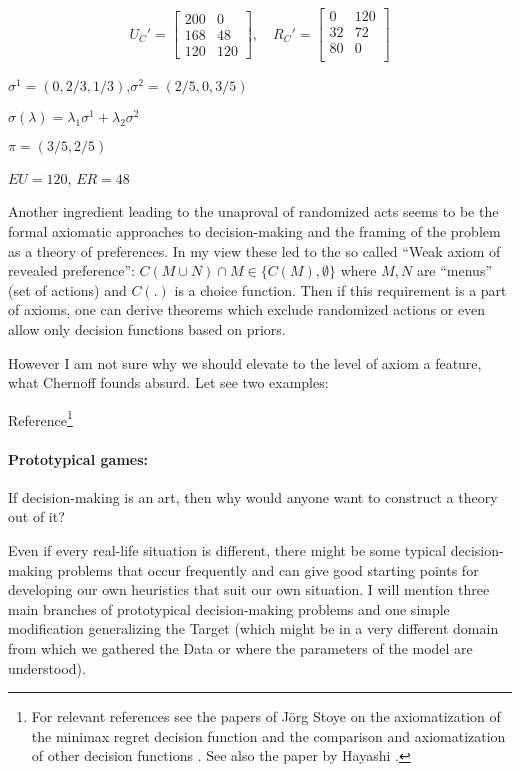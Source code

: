 \documentclass{article}
\begin{document}
\[
U_C' =
\begin{bmatrix}
    200 & 0 \\
    168 & 48 \\
    120 & 120
\end{bmatrix}
, \quad
R_C' =
\begin{bmatrix}
    0 & 120 \\
    32 & 72 \\
    80 & 0 \\
\end{bmatrix}
\]

$\sigma^1=(0,2/3,1/3)$,$\sigma^2=(2/5,0,3/5)$

$\sigma(\lambda)=\lambda_1 \sigma^1 + \lambda_2 \sigma^2$

$\pi=(3/5,2/5)$

$EU = 120$, $ER = 48$




Another ingredient leading to the unaproval of randomized acts seems to be the formal axiomatic approaches to decision-making and the framing of the problem as a theory of preferences.
In my view these led to the so called ``Weak axiom of revealed preference'': $C(M \cup N ) \cap M \in \{C(M), \emptyset\}$ where $M,N$ are ``menus'' (set of actions) and $C(.)$ is a choice function.
Then if this requirement is a part of axioms, one can derive theorems which exclude randomized actions or even allow only decision functions based on priors.

However I am not sure why we should elevate to the level of axiom a feature, what Chernoff founds absurd. Let see two examples:

Reference\footnote{For relevant references see the papers of Jörg Stoye on the axiomatization of the minimax regret decision function \cite{paper:Stoye2011AxiomsForMinimaxRegret} and the comparison and axiomatization of other decision functions \cite{paper:Stoye2012NewPerspectivesOnStatisticalDecisionsUnderAmbiguity,paper:Stoye2010StatisticalDecisionsUnderAmbiguity}. See also the paper by Hayashi \cite{paper:RegretAversion}.}

\fi



\paragraph{Prototypical games:}
If decision-making is an art, then why would anyone want to construct a theory out of it?

Even if every real-life situation is different, there might be some typical decision-making problems that occur frequently and can give good starting points for developing our own heuristics that suit our own situation.
I will mention three main branches of prototypical decision-making problems and one simple modification generalizing the Target (which might be in a very different domain from which we gathered the Data or where the parameters of the model are understood).
\end{document}
